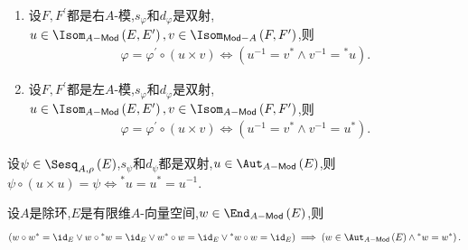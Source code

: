 \begin{proposition}{}{}
	\begin{enumerate}
		\item 设$F,F^{\prime}$都是右$A$-模,$s_{\varphi}$和$d_{\varphi}$是双射,$u\in\Isom_{A-\mathsf{Mod}}\left(E,E^{\prime}\right),v\in\Isom_{\mathsf{Mod}-A}\left(F,F^{\prime}\right)$,则
		\begin{align*}
			\varphi=\varphi^{\prime}\circ\left(u\times v\right)\iff\left(u^{-1}=v^{\ast}\wedge v^{-1}={}^{\ast}u\right).
		\end{align*}
		\item 设$F,F^{\prime}$都是左$A$-模,$s_{\varphi}$和$d_{\varphi}$是双射,$u\in\Isom_{A-\mathsf{Mod}}\left(E,E^{\prime}\right),v\in\Isom_{A-\mathsf{Mod}}\left(F,F^{\prime}\right)$,则
		\begin{align*}
			\varphi=\varphi^{\prime}\circ\left(u\times v\right)\iff\left(u^{-1}=v^{\ast}\wedge v^{-1}=u^{\ast}\right).
		\end{align*}
	\end{enumerate}
\end{proposition}

\begin{corollary}{}{}
	设$\psi\in\Sesq_{A,\rho}\left(E\right)$,$s_{\psi}$和$d_{\psi}$都是双射,$u\in\Aut_{A-\mathsf{Mod}}\left(E\right)$,则$\psi\circ\left(u\times u\right)=\psi\iff {}^{\ast}u=u^{\ast}=u^{-1}$.
\end{corollary}

\begin{remark}{}{}
	设$A$是除环,$E$是有限维$A$-向量空间,$w\in\End_{A-\mathsf{Mod}}\left(E\right)$,则
	\begin{align*}
		\left(w\circ w^{\ast}=\id_{E}\vee w\circ {}^{\ast}w=\id_{E}\vee w^{\ast}\circ w=\id_{E}\vee {}^{\ast}w\circ w=\id_{E}\right)\implies \left(w\in\Aut_{A-\mathsf{Mod}}\left(E\right)\wedge {}^{\ast}w=w^{\ast}\right).
	\end{align*}
\end{remark}















